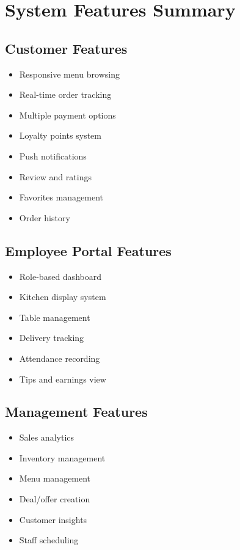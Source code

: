 \documentclass[12pt,a4paper]{article}
\begin{document}
\section{System Features Summary}

\subsection{Customer Features}
\begin{itemize}
    \item Responsive menu browsing
    \item Real-time order tracking
    \item Multiple payment options
    \item Loyalty points system
    \item Push notifications
    \item Review and ratings
    \item Favorites management
    \item Order history
\end{itemize}

\subsection{Employee Portal Features}
\begin{itemize}
    \item Role-based dashboard
    \item Kitchen display system
    \item Table management
    \item Delivery tracking
    \item Attendance recording
    \item Tips and earnings view
\end{itemize}

\subsection{Management Features}
\begin{itemize}
    \item Sales analytics
    \item Inventory management
    \item Menu management
    \item Deal/offer creation
    \item Customer insights
    \item Staff scheduling
\end{itemize}
\end{document}
